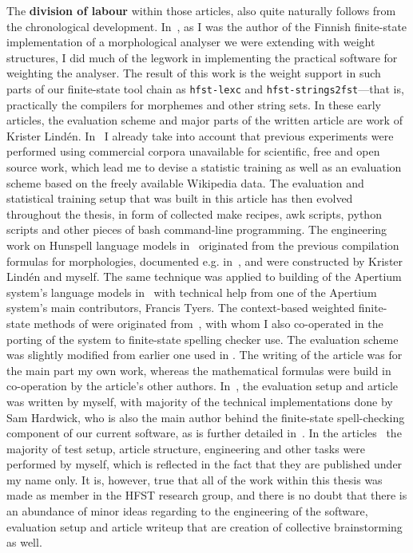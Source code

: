 \documentclass[officiallayout,draft]{unihelcompling}
\begin{document}
The \textbf{division of labour} within those articles, also quite naturally
follows from the chronological development.
In~, as I was the author
of the Finnish finite-state implementation of a morphological analyser we were
extending with weight structures, I did much of the legwork in implementing the
practical software for weighting the analyser. The result of this work is the
weight support in such parts of our finite-state tool chain as
\texttt{hfst-lexc} and \texttt{hfst-strings2fst}---that is, practically the
compilers for morphemes and other string sets. In these early articles, the
evaluation scheme and major parts of the written article are work of Krister
Lindén.  In~ I already take into account
that previous experiments were performed using commercial corpora unavailable
for scientific, free and open source work, which lead me to devise a statistic
training as well as an evaluation scheme based on the freely available
Wikipedia data. The evaluation and statistical training setup that was built in
this article has then evolved throughout the thesis, in form of collected make
recipes, awk scripts, python scripts and other pieces of bash command-line
programming. The engineering work on Hunspell language models
in~ originated from the
previous compilation formulas for morphologies, documented e.g.\/
in~\cite{linden2009hfst}, and were constructed by Krister Lindén and myself.
The same technique was applied to building of the Apertium system's language
models in~ with technical help from one of the
Apertium system's main contributors, Francis Tyers.  The context-based weighted
finite-state methods of  were originated
from~\citet{silfverberg2010partofspeech}, with whom I also co-operated in the
porting of the system to finite-state spelling checker use. The evaluation
scheme was slightly modified from earlier one used in
. The writing of the article
 was for the main part  my own work, whereas
the mathematical formulas were build in co-operation by the article's other
authors.  In~, the evaluation setup and article
was written by myself, with majority of the technical implementations done by
Sam Hardwick, who is also the main author behind the finite-state
spell-checking component of our current software, as is further detailed
in~\citet{linden2011hfst}.  In the
articles~ the majority
of test setup, article structure, engineering and other tasks were performed by
myself, which is reflected in the fact that they are published under my name
only. It is, however, true that all of the work within this thesis was made as
member in the HFST research group, and there is no doubt that there is an
abundance of minor ideas regarding to the engineering of the software,
evaluation setup and article writeup that are creation of collective
brainstorming as well.
\end{document}
